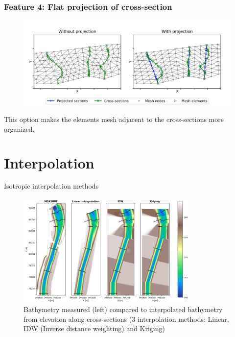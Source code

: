 \documentclass[10pt]{beamer}
\begin{document}
\begin{frame}\frametitle{Feature 4: Flat projection of cross-section}

\begin{figure}[H]
    \centerline{    \includegraphics[width=12cm]{figures/plot_comp_project.png}}
\end{figure}

This option makes the elements mesh adjacent to the cross-sections more organized.

\end{frame}


\section{Interpolation}

\begin{frame}{Isotropic interpolation methods}

\vspace{-0.4cm}
\begin{figure}[H]
    \centering
        \includegraphics[width=0.8\textwidth]{figures/comp_isotropes.png}
        \caption{Bathymetry measured (left) compared to interpolated bathymetry from elevation along cross-sections (3 interpolation methods: Linear, IDW (Inverse distance weighting) and Kriging)}
\end{figure}

\end{frame}
\end{document}
